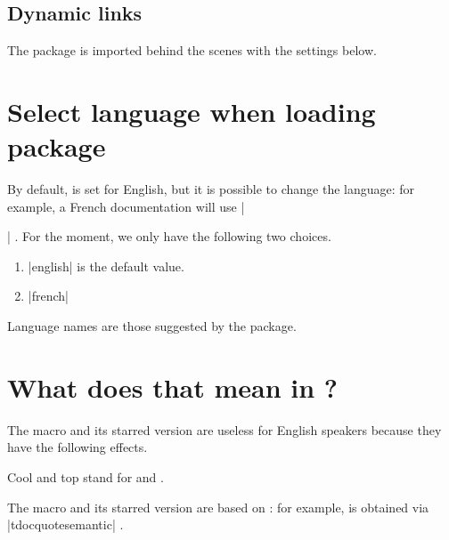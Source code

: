\subsection{Dynamic links}

The  package is imported behind the scenes with the settings below.


\begin{tdoclatex}[code]
\hypersetup{
  colorlinks,
  citecolor = orange!75!black,
  filecolor = orange!75!black,
  linkcolor = orange!75!black,
  urlcolor  = orange!75!black
}
\end{tdoclatex}


\section{Select language when loading package}

By default,  is set for English, but it is possible to change the language: for example, a French documentation will use \tdocinlatex|\usepackage[lang = french]{tutodoc}| .
For the moment, we only have the following two choices.

\begin{enumerate}
    \item \tdocinlatex|english| is the default value.

    \item \tdocinlatex|french|
\end{enumerate}


\begin{tdocnote}
    Language names are those suggested by the  package.
\end{tdocnote}


\section{What does that mean in ?}

The macro  and its starred version are useless for English speakers because they have the following effects.


\begin{tdoclatex}
Cool and top stand for  and .
\end{tdoclatex}


The macro  and its starred version are based on  : for example,  is obtained via \tdocinlatex|tdocquote{semantic}| .


